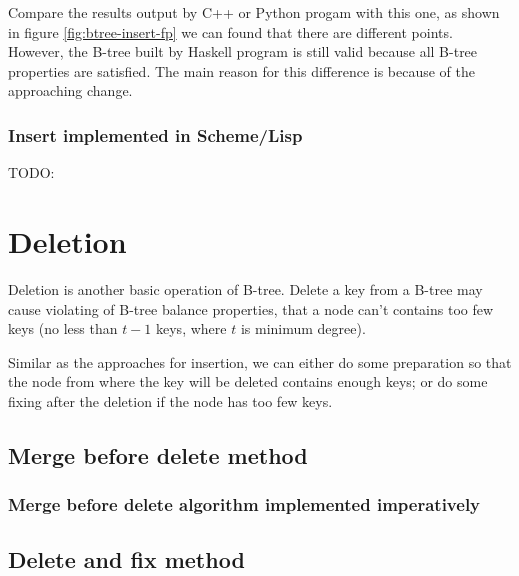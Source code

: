 \documentclass{article}
\begin{document}
Compare the results output by C++ or Python progam with this one,
as shown in figure \ref{fig:btree-insert-fp}
we can found that there are different points. However, the B-tree
built by Haskell program is still valid because all B-tree properties
are satisfied. The main reason for this difference is because of
the approaching change.

\subsubsection*{Insert implemented in Scheme/Lisp}
TODO:


\section{Deletion} 

Deletion is another basic operation of B-tree. Delete a key from a
B-tree may cause violating of B-tree balance properties, that a node
can't contains too few keys (no less than $t-1$ keys, where $t$ is 
minimum degree).

Similar as the approaches for insertion, we can either do some preparation
so that the node from where the key will be deleted contains enough
keys; or do some fixing after the deletion if the node has too few keys.


\subsection{Merge before delete method} 

\subsubsection{Merge before delete algorithm implemented imperatively}



\subsection{Delete and fix method}
\end{document}
